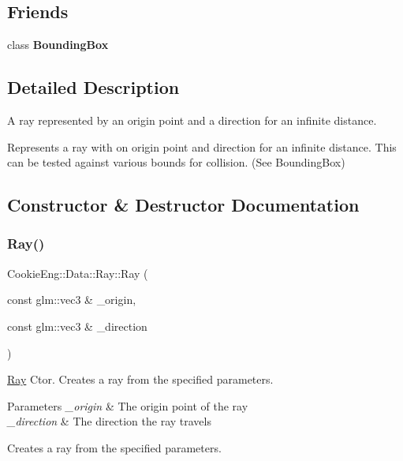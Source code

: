 \subsection*{Friends}
\begin{DoxyCompactItemize}
\item 
\mbox{\label{struct_cookie_eng_1_1_data_1_1_ray_a5f8124438184f87ceb799799fce3ae61}} 
class {\bfseries Bounding\+Box}
\end{DoxyCompactItemize}


\subsection{Detailed Description}
A ray represented by an origin point and a direction for an infinite distance. 

Represents a ray with on origin point and direction for an infinite distance. This can be tested against various bounds for collision. (See Bounding\+Box) 

\subsection{Constructor \& Destructor Documentation}
\mbox{\label{struct_cookie_eng_1_1_data_1_1_ray_a1e9b2fe1c7b82f3ef7e405dbe8a5f4ee}} 
\subsubsection{\texorpdfstring{Ray()}{Ray()}}
{\footnotesize\ttfamily Cookie\+Eng\+::\+Data\+::\+Ray\+::\+Ray (\begin{DoxyParamCaption}\item[{const glm\+::vec3 \&}]{\+\_\+origin,  }\item[{const glm\+::vec3 \&}]{\+\_\+direction }\end{DoxyParamCaption})}



\hyperlink{struct_cookie_eng_1_1_data_1_1_ray}{Ray} Ctor. Creates a ray from the specified parameters. 


\begin{DoxyParams}{Parameters}
{\em \+\_\+origin} & The origin point of the ray \\
\hline
{\em \+\_\+direction} & The direction the ray travels\\
\hline
\end{DoxyParams}
Creates a ray from the specified parameters. 

